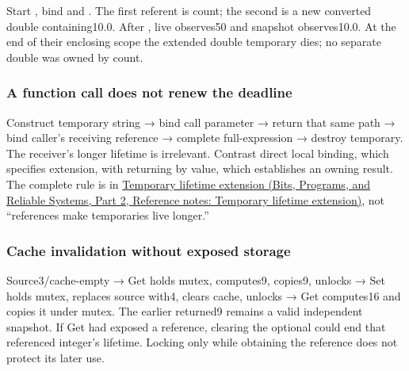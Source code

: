 \hypertarget{appendix-92ff77d4dfdc-direct-alias-versus-converted-snapshot}{}

Start , bind  and . The first referent is count; the second is a new converted double containing10.0. After , live observes50 and snapshot observes10.0. At the end of their enclosing scope the extended double temporary dies; no separate double was owned by count.

\subsubsection{A function call does not renew the deadline}\label{appendix-92ff77d4dfdc-a-function-call-does-not-renew-the-deadline}

\hypertarget{appendix-92ff77d4dfdc-a-function-call-does-not-renew-the-deadline}{}

Construct temporary string → bind call parameter → return that same path → bind caller's receiving reference → complete full-expression → destroy temporary. The receiver's longer lifetime is irrelevant. Contrast direct local binding, which specifies extension, with returning  by value, which establishes an owning result. The complete rule is in \href{../01-Bits-Programs-and-Reliable-Systems-P02/main.pdf\#appendix-a978b29bbbb0}{Temporary lifetime extension (Bits, Programs, and Reliable Systems, Part 2, Reference notes: Temporary lifetime extension)}, not ``references make temporaries live longer.''

\subsubsection{Cache invalidation without exposed storage}\label{appendix-92ff77d4dfdc-cache-invalidation-without-exposed-storage}

\hypertarget{appendix-92ff77d4dfdc-cache-invalidation-without-exposed-storage}{}

Source3/cache-empty → Get holds mutex, computes9, copies9, unlocks → Set holds mutex, replaces source with4, clears cache, unlocks → Get computes16 and copies it under mutex. The earlier returned9 remains a valid independent snapshot. If Get had exposed a reference, clearing the optional could end that referenced integer's lifetime. Locking only while obtaining the reference does not protect its later use.

